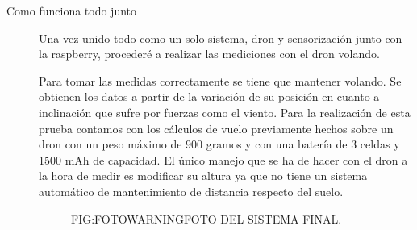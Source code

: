 \begin{description}
\item[Como funciona todo junto]

Una vez unido todo como un solo sistema, dron y sensorización junto con la raspberry, procederé a realizar las mediciones con el dron volando.

Para tomar las medidas correctamente se tiene que mantener volando. Se obtienen los datos a partir de la variación de su posición en cuanto a inclinación que sufre por fuerzas como el viento.
Para la realización de esta prueba contamos con los cálculos de vuelo previamente hechos sobre un dron con un peso máximo de 900 gramos y con una batería de 3 celdas y 1500 mAh de capacidad. El único manejo que se ha de hacer con el dron a la hora de medir es modificar su altura ya que no tiene un sistema automático de mantenimiento de distancia respecto del suelo.

  \begin{figure}[Foto del dron con sensorización de viento]{FIG:FOTOWARNING}{FOTO DEL SISTEMA FINAL.}
\end{figure}


\end{description}

